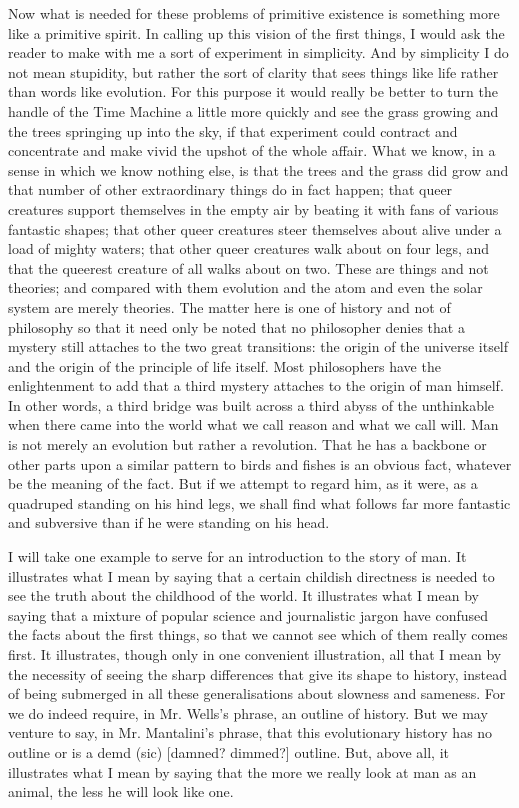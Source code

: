 Now what is needed for these problems of primitive existence is something more like a primitive spirit. In calling up this vision of the first things, I would ask the reader to make with me a sort of experiment in simplicity. And by simplicity I do not mean stupidity, but rather the sort of clarity that sees things like life rather than words like evolution. For this purpose it would really be better to turn the handle of the Time Machine a little more quickly and see the grass growing and the trees springing up into the sky, if that experiment could contract and concentrate and make vivid the upshot of the whole affair. What we know, in a sense in which we know nothing else, is that the trees and the grass did grow and that number of other extraordinary things do in fact happen; that queer creatures support themselves in the empty air by beating it with fans of various fantastic shapes; that other queer creatures steer themselves about alive under a load of mighty waters; that other queer creatures walk about on four legs, and that the queerest creature of all walks about on two. These are things and not theories; and compared with them evolution and the atom and even the solar system are merely theories. The matter here is one of history and not of philosophy so that it need only be noted that no philosopher denies that a mystery still attaches to the two great transitions: the origin of the universe itself and the origin of the principle of life itself. Most philosophers have the enlightenment to add that a third mystery attaches to the origin of man himself. In other words, a third bridge was built across a third abyss of the unthinkable when there came into the world what we call reason and what we call will. Man is not merely an evolution but rather a revolution. That he has a backbone or other parts upon a similar pattern to birds and fishes is an obvious fact, whatever be the meaning of the fact. But if we attempt to regard him, as it were, as a quadruped standing on his hind legs, we shall find what follows far more fantastic and subversive than if he were standing on his head.

I will take one example to serve for an introduction to the story of man. It illustrates what I mean by saying that a certain childish directness is needed to see the truth about the childhood of the world. It illustrates what I mean by saying that a mixture of popular science and journalistic jargon have confused the facts about the first things, so that we cannot see which of them really comes first. It illustrates, though only in one convenient illustration, all that I mean by the necessity of seeing the sharp differences that give its shape to history, instead of being submerged in all these generalisations about slowness and sameness. For we do indeed require, in Mr. Wells's phrase, an outline of history. But we may venture to say, in Mr. Mantalini's phrase, that this evolutionary history has no outline or is a demd (sic) [damned? dimmed?] outline. But, above all, it illustrates what I mean by saying that the more we really look at man as an animal, the less he will look like one.

